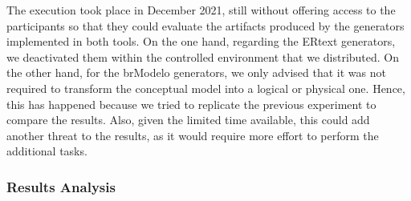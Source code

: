 The execution took place in December 2021, still without offering access to the participants so that they could evaluate the artifacts produced by the generators implemented in both tools.
On the one hand, regarding the ERtext generators, we deactivated them within the controlled environment that we distributed.
On the other hand, for the brModelo generators, we only advised that it was not required to transform the conceptual model into a logical or physical one.
Hence, this has happened because we tried to replicate the previous experiment to compare the results. 
Also, given the limited time available, this could add another threat to the results, as it would require more effort to perform the additional tasks.

\subsubsection{Results Analysis}

